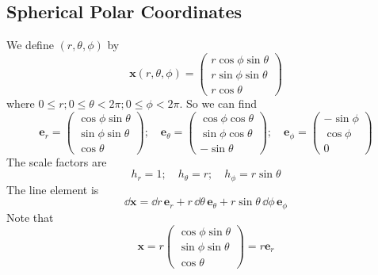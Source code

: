 \documentclass{article}
\begin{document}
\subsection{Spherical Polar Coordinates}
We define $(r, \theta, \phi)$ by
\[ \bm x(r, \theta, \phi) = \begin{pmatrix}
        r \cos \phi \sin \theta \\
        r \sin \phi \sin \theta \\
        r \cos \theta
    \end{pmatrix} \]
where $0 \leq r; 0 \leq \theta < 2 \pi; 0 \leq \phi < 2 \pi$. So we can find
\[ \bm e_r = \begin{pmatrix}
        \cos \phi \sin \theta \\ \sin \phi \sin \theta \\ \cos \theta
    \end{pmatrix};\quad \bm e_\theta = \begin{pmatrix}
        \cos \phi \cos \theta \\ \sin \phi \cos \theta \\ -\sin \theta
    \end{pmatrix};\quad \bm e_\phi = \begin{pmatrix}
        -\sin \phi \\ \cos \phi \\ 0
    \end{pmatrix} \]
The scale factors are
\[ h_r = 1;\quad h_\theta = r;\quad h_\phi = r \sin \theta \]
The line element is
\[ \dd \bm x = \dd r \, \bm e_r + r \, \dd \theta \, \bm e_\theta + r \sin \theta \, \dd \phi \, \bm e_\phi \]
Note that
\[ \bm x = r \begin{pmatrix}
        \cos \phi \sin \theta \\ \sin \phi \sin \theta \\ \cos \theta
    \end{pmatrix} = r \bm e_r \]
\end{document}
